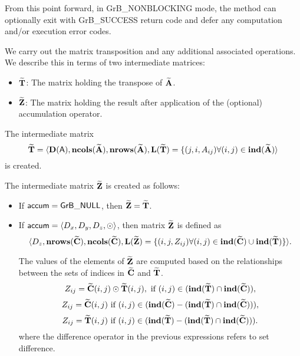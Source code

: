 From this point forward, in {\sf GrB\_NONBLOCKING} mode, the method can 
optionally exit with {\sf GrB\_SUCCESS} return code and defer any computation 
and/or execution error codes.

We carry out the matrix transposition and any additional 
associated operations.  We describe this in terms of two intermediate matrices:
\begin{itemize}
    \item ${\bf \widetilde{T}}$: The matrix holding the  transpose of
    ${\bf \widetilde{A}}$.
    \item ${\bf \widetilde{Z}}$: The matrix holding the result after 
    application of the (optional) accumulation operator.
\end{itemize}

The intermediate matrix
\[
{\bf \widetilde{T}} = \langle
\bold{D}({\bf \sf A}), \bold{ncols}({\bf \widetilde{A}}),
\bold{nrows}({\bf \widetilde{A}}), \bold{L}({\bf \widetilde{T}}) =
\{(j,i,A_{ij}) \forall (i,j) \in \bold{ind}({\bf \widetilde{A}}) 
\rangle
\]
is created.  

The intermediate matrix ${\bf \widetilde{Z}}$ is created as follows:
\begin{itemize}
    \item If ${\sf accum} = {\sf GrB\_NULL}$, then ${\bf \widetilde{Z}} = {\bf \widetilde{T}}$.

    \item If ${\sf accum} = \langle D_x, D_y, D_z, \odot \rangle$, then matrix ${\bf \widetilde{Z}}$ is defined as 
        \[ \langle D_z, \bold{nrows}({\bf \widetilde{C}}), \bold{ncols}({\bf \widetilde{C}}),
        \bold{L}({\bf \widetilde{Z}}) 
		= \{(i,j,Z_{ij})  \forall (i,j) \in \bold{ind}({\bf \widetilde{C}}) \cup 
        \bold{ind}({\bf \widetilde{T}}) \} \rangle. \]

        The values of the elements of ${\bf \widetilde{Z}}$ are computed based on the 
        relationships between the sets of indices in ${\bf \widetilde{C}}$ and 
        ${\bf \widetilde{T}}$.
\[
Z_{ij} = {\bf \widetilde{C}}(i,j) \odot {\bf \widetilde{T}}(i,j), \ \mbox{if}\  (i,j) \in  (\bold{ind}({\bf \widetilde{T}}) \cap \bold{ind}({\bf \widetilde{C}})),
\]
\[
Z_{ij} = \matrix{\widetilde{C}}(i,j) \ \mbox{if}\  (i,j) \in  (\bold{ind}(\matrix{\widetilde{C}}) - (\bold{ind}(\matrix{\widetilde{T}}) \cap \bold{ind}(\matrix{\widetilde{C}}))),
\]
\[
Z_{ij} = \matrix{\widetilde{T}}(i,j) \ \mbox{if}\  (i,j) \in  (\bold{ind}(\matrix{\widetilde{T}}) - (\bold{ind}(\matrix{\widetilde{T}}) \cap \bold{ind}(\matrix{\widetilde{C}}))).
\]
where the difference operator in the previous expressions refers to set difference.
\end{itemize}

